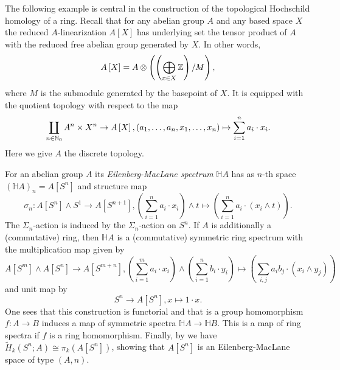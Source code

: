 The following example is central in the construction of the topological Hochschild homology
of a ring. Recall that for any abelian group $A$ and any based space $X$ the 
reduced $A$-linearization $A\left[X\right]$ has underlying set
the tensor product of $A$ with the reduced free abelian group generated by $X$.
In other words,
\[
A\left[X\right] = A\otimes \left(\left(\bigoplus_{x\in X}\mathbb{Z}\right)/M\right),
\]
where $M$ is the submodule generated by the basepoint of $X$.
It is equipped with the quotient topology with respect to the map
\[
\coprod_{n\in \mathbb{N}_0} A^n\times X^n\to A\left[X\right], (a_1,\ldots, a_n, x_1,\ldots, x_n)\mapsto \sum_{i = 1}^n a_i\cdot x_i.
\]
Here we give $A$ the discrete topology.
\begin{bsp}
For an abelian group $A$ its \textit{Eilenberg-MacLane spectrum} $\mathbb{H}A$ has as $n$-th space
$(\mathbb{H}A)_n = A\left[S^n \right]$ and structure map
\[
\sigma_n:A\left[S^n\right]\wedge S^1\to A\left[S^{n+1}\right], 
\left(\sum_{i = 1}^n a_i\cdot x_i\right)\wedge t\mapsto \left(\sum_{i = 1}^n a_i\cdot (x_i\wedge t)\right).
\]
The $\Sigma_n$-action is induced by the $\Sigma_n$-action on $S^n$.
If $A$ is additionally a (commutative) ring, then $\mathbb{H}A$ is a (commutative) symmetric ring spectrum
with the multiplication map given by
\[
A\left[S^m\right]\wedge A\left[S^n\right]\to A\left[S^{m+n}\right], 
\left(\sum_{i=1}^m a_i\cdot x_i\right)\wedge \left(\sum_{i=1}^n b_i\cdot y_i\right)\mapsto
\left(\sum_{i,j} a_ib_j\cdot(x_i\wedge y_j)\right)
\]
and unit map by
\[
S^n\to A\left[S^n\right], x\mapsto 1\cdot x.
\]
One sees that this construction is functorial and that is a group homomorphism $f:A\to B$
induces a map of symmetric spectra $\mathbb{H}A\to \mathbb{H}B$. This is
a map of ring spectra if $f$ is a ring homomorphism.
Finally, by \cite[Theorem~11.4, \pno~295]{mccord} we have $\tilde H_k(S^n;A)\cong \pi_k\left(A\left[S^n\right]\right)$,
showing that $A\left[S^n\right]$ is an Eilenberg-MacLane space of type $(A,n)$.
\end{bsp}
